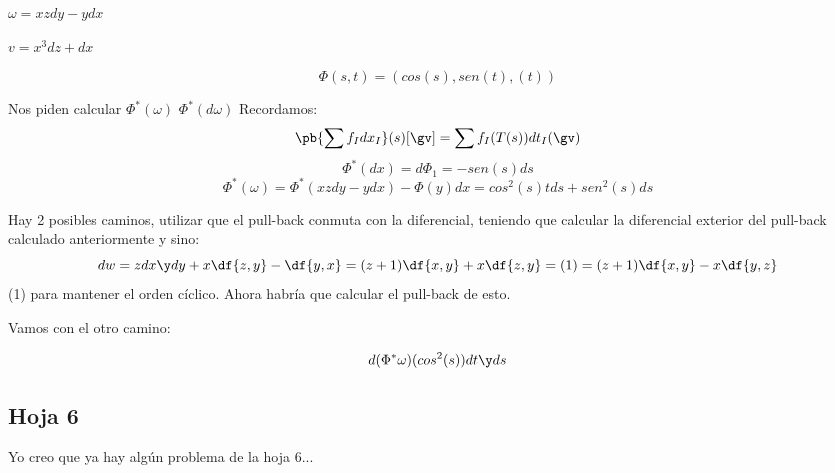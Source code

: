 \begin{problem}[9]	
$\omega = xzdy - ydx$

$v = x^3dz+dx$


\[\Phi(s,t) = (cos(s),sen(t),(t))\]

Nos piden calcular 
\ppart
$\Phi^{\ast}(\omega)$
\ppart
$\Phi^{\ast}(d\omega)$
\solution
Recordamos:
\[\pb{\sum f_Idx_I}(s)[\gv] = \sum f_I(T(s))dt_I(\gv)\]
\[\Phi^{\ast}(dx)=d\Phi_1 = -sen(s)ds\]
\spart
\[\Phi^{\ast}(\omega) = \Phi^{\ast} (xzdy - ydx) - \Phi(y)dx = cos^2(s)tds +sen^2(s)ds\]
\spart

Hay 2 posibles caminos, utilizar que el pull-back conmuta con la diferencial, teniendo que calcular la diferencial exterior del pull-back calculado anteriormente y sino:
\[dw = zdx\y dy + x\df{z,y} - \df{y,x} = (z+1)\df{x,y} + x\df{z,y} = (1) = (z+1)\df{x,y} - x\df{y,z}\]
(1) para mantener el orden cíclico.
Ahora habría que calcular el pull-back de esto.

Vamos con el otro camino:

\[d(\Phi^{\ast}\omega) (cos^2(s))dt\y ds\]
\end{problem}


\subsection{Hoja 6}

Yo creo que ya hay algún problema de la hoja 6...

